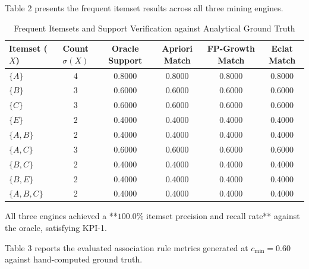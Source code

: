 \documentclass[11pt,a4paper]{article}
\newcommand{\toprule}{\hline\hline}
\newcommand{\midrule}{\hline}
\newcommand{\bottomrule}{\hline\hline}
\begin{document}
Table 2 presents the frequent itemset results across all three mining engines.

\begin{table}[!ht]
\centering
\caption{Frequent Itemsets and Support Verification against Analytical Ground Truth}
\vspace{0.2em}
\footnotesize
\begin{tabular}{lccccc}
\toprule
\textbf{Itemset ($X$)} & \textbf{Count $\sigma(X)$} & \textbf{Oracle Support} & \textbf{Apriori Match} & \textbf{FP-Growth Match} & \textbf{Eclat Match} \\
\midrule
$\{A\}$ & 4 & 0.8000 & 0.8000 & 0.8000 & 0.8000 \\
$\{B\}$ & 3 & 0.6000 & 0.6000 & 0.6000 & 0.6000 \\
$\{C\}$ & 3 & 0.6000 & 0.6000 & 0.6000 & 0.6000 \\
$\{E\}$ & 2 & 0.4000 & 0.4000 & 0.4000 & 0.4000 \\
$\{A, B\}$ & 2 & 0.4000 & 0.4000 & 0.4000 & 0.4000 \\
$\{A, C\}$ & 3 & 0.6000 & 0.6000 & 0.6000 & 0.6000 \\
$\{B, C\}$ & 2 & 0.4000 & 0.4000 & 0.4000 & 0.4000 \\
$\{B, E\}$ & 2 & 0.4000 & 0.4000 & 0.4000 & 0.4000 \\
$\{A, B, C\}$ & 2 & 0.4000 & 0.4000 & 0.4000 & 0.4000 \\
\bottomrule
\end{tabular}
\end{table}

All three engines achieved a **$100.0\%$ itemset precision and recall rate** against the oracle, satisfying KPI-1.

Table 3 reports the evaluated association rule metrics generated at $c_{\min} = 0.60$ against hand-computed ground truth.
\end{document}
